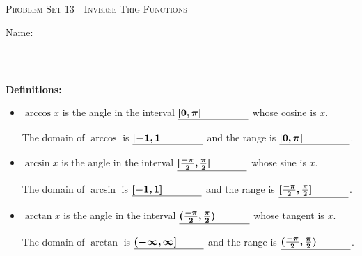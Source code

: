 \documentclass{article}
\begin{document}
\begin{center}
  \large\textsc{Problem Set 13 - Inverse Trig Functions}
  
      \pspace{12pt}
  \begin{problemonly}\large Name: \rule{5cm}{0.15mm}\\ \end{problemonly}
\end{center}

\begin{framed}
\textbf{Definitions:}
      \begin{itemize}[topsep=0pt]
        \item $\arccos x$ is the angle in the interval $\fitb{1in}{[0,\pi]}$ 
        whose cosine is $x$.

        The domain of $\arccos$ is $\fitb{1in}{[-1,1]}$ 
        and the range is $\fitb{1in}{[0,\pi]}$.
        
        \item $\arcsin x$ is the angle in the interval $\fitb{1in}{[\frac{-\pi}{2},
        \frac{\pi}{2}]}$ whose sine is $x$.

        The domain of $\arcsin$ is $\fitb{1in}{[-1,1]}$ 
        and the range is $\fitb{1in}{[\frac{-\pi}{2},
        \frac{\pi}{2}]}$.
        
        \item $\arctan x$ is the angle in the interval $\fitb{1in}{(\frac{-\pi}{2},
        \frac{\pi}{2})}$ whose tangent is $x$.

        The domain of $\arctan$ is $\fitb{1in}{(-\infty,\infty]}$ 
        and the range is $\fitb{1in}{(\frac{-\pi}{2},
        \frac{\pi}{2})}$.
      \end{itemize}
\end{framed}
\vspace{-8pt}
\end{document}
